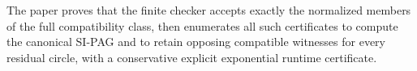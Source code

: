 The paper proves that the finite checker accepts exactly the normalized members of the full compatibility class, then enumerates all such certificates to compute the canonical SI-PAG and to retain opposing compatible witnesses for every residual circle, with a conservative explicit exponential runtime certificate.